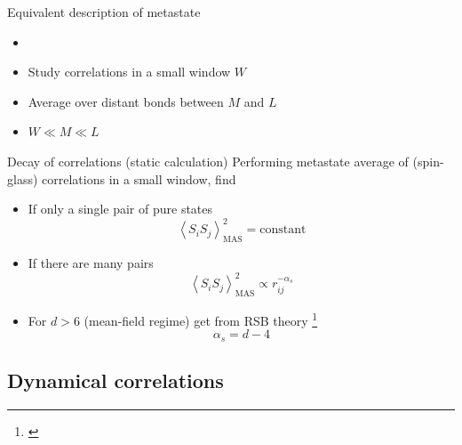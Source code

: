 \documentclass{beamer}
\newcommand{\av}[1]{\left<#1\right>}
\begin{document}
\begin{frame}{Equivalent description of metastate}
  \begin{itemize}
    \item \textcite{aizenman1990rounding}
    \item Study correlations in a \alert{small window} $W$
    \item Average over \alert{distant bonds} between $M$ and $L$
    \item $W \ll M \ll L$
  \end{itemize}
  \begin{figure}
  \end{figure}
\end{frame}

\begin{frame}{Decay of correlations (static calculation)}
  Performing metastate average of (spin-glass) correlations in a small window,
  find
  \begin{itemize}
    \item If only a \alert{single pair} of pure states
    \begin{equation*}
      \av{S_i S_j}^2_{\text{MAS}} = \text{constant}
    \end{equation*}
    \item If there are \alert{many pairs}
    \begin{equation*}
      \av{S_i S_j}^2_{\text{MAS}} \propto r_{ij}^{-\alpha_s}
    \end{equation*}
    \item For $d>6$ (mean-field regime) get from RSB theory%
      \footnote{\textcite{read2014short}}
      \begin{equation*}
        \boxed{\alpha_s = d-4}
      \end{equation*}
  \end{itemize}
\end{frame}


\subsection{Dynamical correlations}
\end{document}
